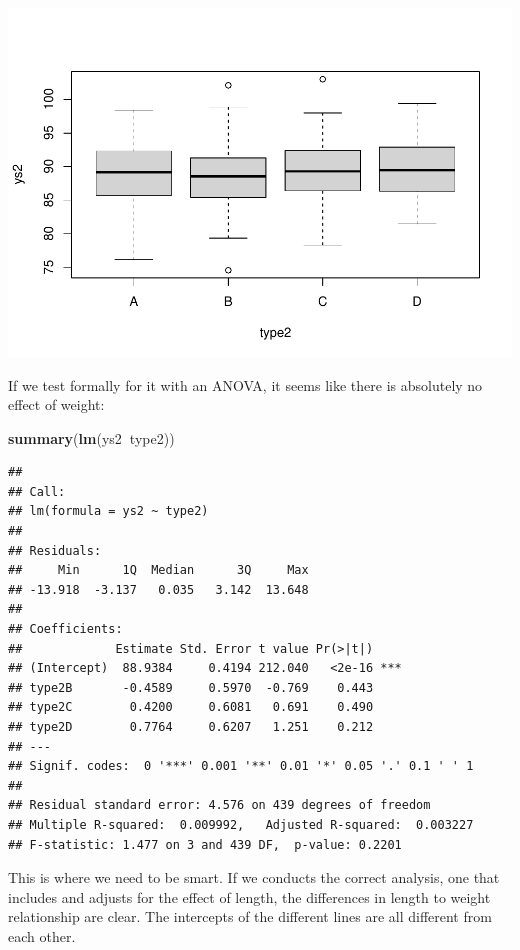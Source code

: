 \documentclass[
]{book}
\newenvironment{Shaded}{\begin{snugshade}}{\end{snugshade}}
\newcommand{\KeywordTok}[1]{\textcolor[rgb]{0.13,0.29,0.53}{\textbf{#1}}}
\newcommand{\NormalTok}[1]{#1}
\newcommand{\OperatorTok}[1]{\textcolor[rgb]{0.81,0.36,0.00}{\textbf{#1}}}
\begin{document}
\includegraphics{ECOMODbook_files/figure-latex/a10.12-1.pdf}

If we test formally for it with an ANOVA, it seems like there is absolutely no effect of weight:

\begin{Shaded}
\begin{Highlighting}[]
\KeywordTok{summary}\NormalTok{(}\KeywordTok{lm}\NormalTok{(ys2}\OperatorTok{~}\NormalTok{type2))}
\end{Highlighting}
\end{Shaded}

\begin{verbatim}
## 
## Call:
## lm(formula = ys2 ~ type2)
## 
## Residuals:
##     Min      1Q  Median      3Q     Max 
## -13.918  -3.137   0.035   3.142  13.648 
## 
## Coefficients:
##             Estimate Std. Error t value Pr(>|t|)    
## (Intercept)  88.9384     0.4194 212.040   <2e-16 ***
## type2B       -0.4589     0.5970  -0.769    0.443    
## type2C        0.4200     0.6081   0.691    0.490    
## type2D        0.7764     0.6207   1.251    0.212    
## ---
## Signif. codes:  0 '***' 0.001 '**' 0.01 '*' 0.05 '.' 0.1 ' ' 1
## 
## Residual standard error: 4.576 on 439 degrees of freedom
## Multiple R-squared:  0.009992,	Adjusted R-squared:  0.003227 
## F-statistic: 1.477 on 3 and 439 DF,  p-value: 0.2201
\end{verbatim}

This is where we need to be smart. If we conducts the correct analysis, one that includes and adjusts for the effect of length, the differences in length to weight relationship are clear. The intercepts of the different lines are all different from each other.
\end{document}
